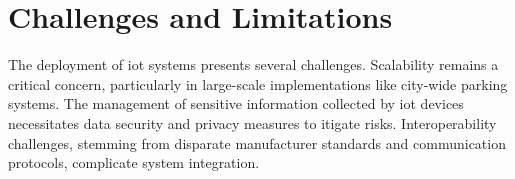 \section{Challenges and Limitations}
The deployment of \gls{iot} systems presents several challenges. Scalability remains a critical concern, particularly in large-scale implementations like city-wide parking systems. The management of sensitive information collected by \gls{iot} devices necessitates data security and privacy measures to itigate risks. Interoperability challenges, stemming from disparate manufacturer standards and communication protocols, complicate system integration.

